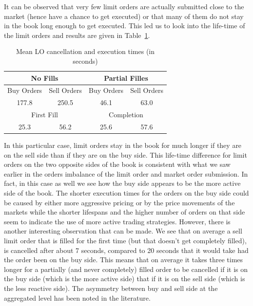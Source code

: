 It can be observed that very few limit orders are actually submitted close to the market (hence have a chance to get executed) or that many of them do not stay in the book long enough to get executed. This led us to look into the life-time of the limit orders and results are given in Table~\ref{tab:meanlo}.
	\begin{table}[htbp]
	\centering
	\caption{Mean LO cancellation and execution times (in seconds) \label{tab:meanlo}}
	\begin{tabular}{cccc}
	\multicolumn{2}{c}{No Fills} & \multicolumn{2}{c}{Partial Filles} \\ \hline
	Buy Orders & Sell Orders & Buy Orders & Sell Orders \\ \hline
	177.8 & 250.5 & 46.1 & 63.0 \\ \hline
	\multicolumn{2}{c}{First Fill} & \multicolumn{2}{c}{Completion} \\ \hline
	 25.3 & 56.2 & 25.6 & 57.6
	\end{tabular}
	\end{table}
In this particular case, limit orders stay in the book for much longer if they are on the sell side than if they are on the buy side. This life-time difference for limit orders on the two opposite sides of the book is consistent with what we saw earlier in the orders imbalance of the limit order and market order submission. In fact, in this case as well we see how the buy side appears to be the more active side of the book. The shorter execution times for the orders on the buy side could be caused by either more aggressive pricing or by the price movements of the markets while the shorter lifespans and the higher number of orders on that side seem to indicate the use of more active trading strategies. However, there is another interesting observation that can be made. We see that on average a sell limit order that is filled for the first time (but that doesn't get completely filled), is cancelled after about 7 seconds, compared to 20 seconds that it would take had the order been on the buy side. This means that on average it takes three times longer for a partially (and never completely) filled order to be cancelled if it is on the buy side (which is the more active side) that if it is on the sell side (which is the less reactive side). The asymmetry between buy and sell side at the aggregated level has been noted in the literature.


